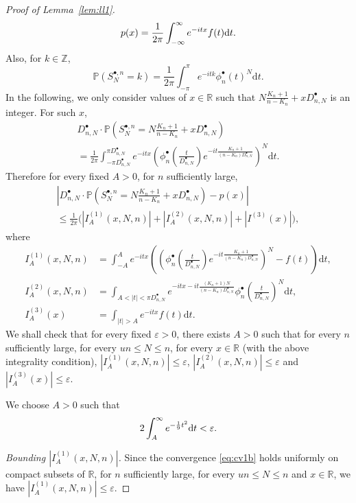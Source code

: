 \documentclass[AHL,XML,longabstracts,Unicode]{cedram}
\newcommand{\R}{\mathbb{R}}
\def\d{{\rm d}}
\def\Sbn{S^{\bullet,n}}
\def\phibn{\phi^{\bullet}_{n}}
\def\DbnN{D^{\bullet}_{n,N}}
\renewcommand{\epsilon}{\varepsilon}
\renewcommand\Pr[1]{\mathbb{P}\left(#1\right)}
\begin{document}
\begin{proof}[Proof of Lemma~\ref{lem:ll1}]
\begin{equation}
 \label{eq:fourierb}  p(x)= \frac{1}{2\pi} \int_{-\infty}^{\infty} e^{-itx} f(t) {\d}t.
 \end{equation}
Also, for $k \in \mathbb{Z}$,
\[ \Pr{\Sbn_{N}=k} = \frac{1}{2\pi} \int_{-\pi}^{\pi} e^{-itk} \phibn(t)^{ N} {\mathrm{d}}t.\]
In the following, we only consider values of $x \in \R$ such that $N \frac{K_{n}+1}{n-K_{n}}+x  \DbnN$ is an integer.
For such $x$,
\begin{multline*}
  \DbnN \cdot \Pr{\Sbn_{ N}= N \frac{K_{n}+1}{n-K_{n}}+x  \DbnN}\\
  =  \frac{1}{2\pi} \int^{\pi \DbnN}_{-\pi \DbnN} e^{- i t x} \left(  \phibn \left(  \frac{t}{\DbnN} \right)   e^{-it \frac{K_{n}+1}{(n-K_{n}) \DbnN}} \right)^{N} {\mathrm{d}}t.
\end{multline*}
Therefore for every fixed $A>0$, for $n$ sufficiently large,
\begin{multline*}
  \left| \DbnN \cdot \Pr{\Sbn_{N}= N \frac{K_{n}+1}{n-K_{n}}+x  \DbnN} -p( x)\right| \\
  \leq \frac{1}{2 \pi} \big(|I^{(1)}_{A}(x,N,n)| + |I^{(2)}_{A}(x,N,n)|+|I^{(3)}(x)|\big),
\end{multline*}
where
\begin{align*}
  I^{(1)}_{A}(x,N,n)&=\int_{-A}^{A} e^{-i t x} \left(   \left(  \phibn \left(  \frac{t}{\DbnN} \right)   e^{-it \frac{K_{n}+1}{(n-K_{n}) \DbnN}} \right)^{N}- f(t) \right) {\mathrm{d}}t,\\
 I^{(2)}_{A}(x,N,n)&= \int_{A<|t|< \pi \DbnN} e^{-itx - it \frac{(K_{n}+1) N}{(n-K_{n}) \DbnN}} \phibn \left(  \frac{t}{\DbnN} \right) ^{ N}{\mathrm{d}}t, \\
 I^{(3)}_{A}(x)&= \int_{|t|>A} e^{-itx} f(t) {\mathrm{d}}t.
 \end{align*}
We shall check that for every fixed $\epsilon>0$, there exists $A>0$ such that for every $n$ sufficiently large, for every $ un \leq N \leq  n$, for every $x \in \R$ (with the above integrality condition),  $|I^{(1)}_{A}(x,N,n)| \leq \epsilon$, $|I^{(2)}_{A}(x,N,n)| \leq \epsilon$ and $|I^{(3)}_{A}(x)| \leq\epsilon$.



 We choose $A >0$ such that
\begin{equation}
\label{eq:Ab} 2 \int_{A}^{\infty } e^{-  \frac{1}{9} t^{2}} {\d}t < \epsilon.
\end{equation}


\emph{Bounding $|I^{(1)}_{A}(x,N,n)|$.} Since the convergence \eqref{eq:cv1b} holds  uniformly on compact subsets of $\R$, for   $n$ sufficiently large, for every $ un \leq N \leq n$ and $x \in \R$, we have $|I^{(1)}_{A}(x,N,n)| \leq \epsilon$.


\end{proof}
\end{document}
